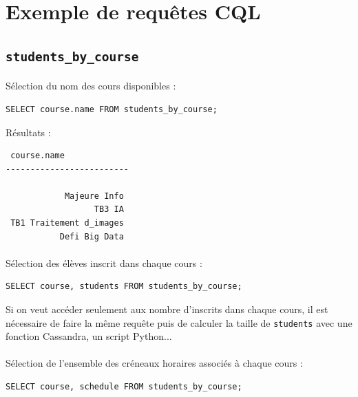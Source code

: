 \documentclass[a4paper, 11pt]{article}
\begin{document}
\section{Exemple de requêtes CQL}
\subsection{\texttt{students\_by\_course}}
\paragraph{}
Sélection du nom des cours disponibles :
\begin{tcolorbox}
\begin{lstlisting}
SELECT course.name FROM students_by_course;
\end{lstlisting}
\end{tcolorbox}

Résultats :
\begin{tcolorbox}
\begin{lstlisting}
 course.name
-------------------------

            Majeure Info
                  TB3 IA
 TB1 Traitement d_images
           Defi Big Data
\end{lstlisting}
\end{tcolorbox}

\paragraph{}
Sélection des élèves inscrit dans chaque cours :
\begin{tcolorbox}
\begin{lstlisting}
SELECT course, students FROM students_by_course;
\end{lstlisting}
\end{tcolorbox}
Si on veut accéder seulement aux nombre d'inscrits dans chaque cours, il est nécessaire de faire la même requête puis de calculer la taille de \texttt{students} avec une fonction Cassandra, un script Python...

\paragraph{}
Sélection de l'ensemble des créneaux horaires associés à chaque cours :
\begin{tcolorbox}
\begin{lstlisting}
SELECT course, schedule FROM students_by_course;
\end{lstlisting}
\end{tcolorbox}
\end{document}
